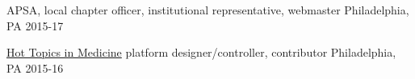 
\begin{cvhonors}

\cvhonor
{APSA, local chapter}
{officer, institutional representative, webmaster}
{Philadelphia, PA}
{2015-17}

\cvhonor
{\href{https://youtu.be/pUT4e4QZEpY}{Hot Topics in Medicine}}
{platform designer/controller, contributor}
{Philadelphia, PA}
{2015-16}
\end{cvhonors}